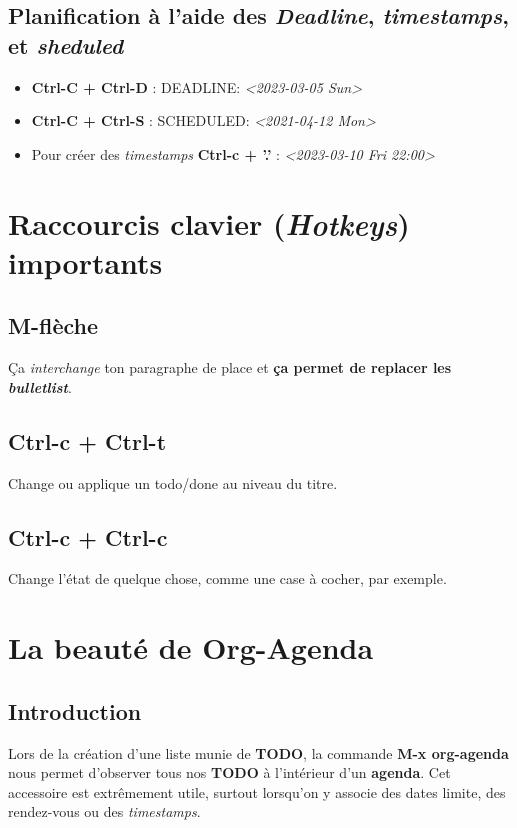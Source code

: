 \documentclass{article}
\numberwithin{equation}{section}
\begin{document}
\subsection{Planification à l'aide des \emph{Deadline}, \emph{timestamps}, et \emph{sheduled}}
\label{sec:orgb6a9a83}
\begin{itemize}
\item \textbf{Ctrl-C + Ctrl-D} : DEADLINE: \textit{<2023-03-05 Sun>}
\item \textbf{Ctrl-C + Ctrl-S} : SCHEDULED: \textit{<2021-04-12 Mon>}
\item Pour créer des \emph{timestamps} \textbf{Ctrl-c + '.'} : \textit{<2023-03-10 Fri 22:00>}
\end{itemize}

\section{Raccourcis clavier (\emph{Hotkeys}) importants}
\label{sec:orge9e8252}
\subsection{\textbf{M-flèche}}
\label{sec:org686c852}
Ça \emph{interchange} ton paragraphe de place et \textbf{ça permet de replacer les \emph{bulletlist}}.

\subsection{\textbf{Ctrl-c + Ctrl-t}}
\label{sec:org8f4d5b7}
Change ou applique un todo/done au niveau du titre.

\subsection{\textbf{Ctrl-c + Ctrl-c}}
\label{sec:org6851215}
Change l'état de quelque chose, comme une case à cocher, par exemple. 

\section{La beauté de \textbf{Org-Agenda}}
\label{sec:orgbacb422}
\subsection{Introduction}
\label{sec:orgd154dea}
Lors de la création d'une liste munie de \textbf{TODO}, la commande \textbf{M-x org-agenda} nous permet d'observer tous nos \textbf{TODO} à l'intérieur d'un \textbf{agenda}.
Cet accessoire est extrêmement utile, surtout lorsqu'on y associe des dates limite, des rendez-vous ou des \emph{timestamps}. 
\end{document}
